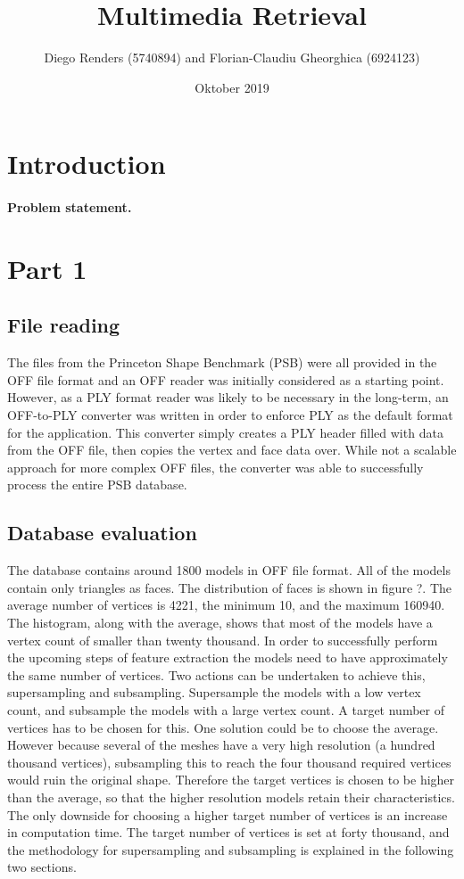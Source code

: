 \documentclass{bigdata}
\title{Multimedia Retrieval}
\author{Diego Renders (5740894) and Florian-Claudiu Gheorghica (6924123)}
\date{Oktober 2019}
\begin{document}
\maketitle

\section{Introduction}

\paragraph*{Problem statement.}

\newpage

\section{Part 1}

\subsection{File reading}

The files from the Princeton Shape Benchmark (PSB) were all provided in the OFF file format and an OFF reader was initially considered as a starting point. However, as a PLY format reader was likely to be necessary in the long-term, an OFF-to-PLY converter was written in order to enforce PLY as the default format for the application.
This converter simply creates a PLY header filled with data from the OFF file, then copies the vertex and face data over. While not a scalable approach for more complex OFF files, the converter was able to successfully process the entire PSB database.

\subsection{Database evaluation}
The database contains around 1800 models in OFF file format. All of the models contain only triangles as faces. The distribution of faces is shown in figure ?. The average number of vertices is 4221, the minimum 10, and the maximum 160940. The histogram, along with the average, shows that most of the models have a vertex count of smaller than twenty thousand. In order to successfully perform the upcoming steps of feature extraction the models need to have approximately the same number of vertices. Two actions can be undertaken to achieve this, supersampling and subsampling. Supersample the models with a low vertex count, and subsample the models with a large vertex count. A target number of vertices has to be chosen for this. One solution could be to choose the average. However because several of the meshes have a very high resolution (a hundred thousand vertices), subsampling this to reach the four thousand required vertices would ruin the original shape. Therefore the target vertices is chosen to be higher than the average, so that the higher resolution models retain their characteristics. The only downside for choosing a higher target number of vertices is an increase in computation time. The target number of vertices is set at forty thousand, and the methodology for supersampling and subsampling is explained in the following two sections.
\end{document}

